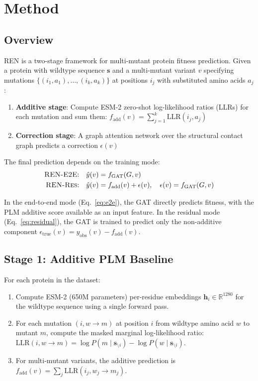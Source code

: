 \documentclass{article}
\newcommand{\ren}{\textsc{REN}}
\newcommand{\rene}{\textsc{REN-E2E}}
\newcommand{\renr}{\textsc{REN-Res}}
\begin{document}
\section{Method}
\label{sec:method}

\subsection{Overview}

\ren{} is a two-stage framework for multi-mutant protein fitness prediction. Given a protein with wildtype sequence $\mathbf{s}$ and a multi-mutant variant $v$ specifying mutations $\{(i_1, a_1), \ldots, (i_k, a_k)\}$ at positions $i_j$ with substituted amino acids $a_j$:

\begin{enumerate}
    \item \textbf{Additive stage}: Compute ESM-2 zero-shot log-likelihood ratios (LLRs) for each mutation and sum them: $f_\text{add}(v) = \sum_{j=1}^{k} \text{LLR}(i_j, a_j)$
    \item \textbf{Correction stage}: A graph attention network over the structural contact graph predicts a correction $\epsilon(v)$
\end{enumerate}

The final prediction depends on the training mode:
\begin{align}
    \text{\rene{}:} \quad \hat{y}(v) &= f_\text{GAT}(G, v) \label{eq:e2e} \\
    \text{\renr{}:} \quad \hat{y}(v) &= f_\text{add}(v) + \epsilon(v), \quad \epsilon(v) = f_\text{GAT}(G, v) \label{eq:residual}
\end{align}

In the end-to-end mode (Eq.~\ref{eq:e2e}), the GAT directly predicts fitness, with the PLM additive score available as an input feature. In the residual mode (Eq.~\ref{eq:residual}), the GAT is trained to predict only the non-additive component $\epsilon_\text{true}(v) = y_\text{obs}(v) - f_\text{add}(v)$.

\subsection{Stage 1: Additive PLM Baseline}

For each protein in the dataset:
\begin{enumerate}
    \item Compute ESM-2 (650M parameters) per-residue embeddings $\mathbf{h}_i \in \mathbb{R}^{1280}$ for the wildtype sequence using a single forward pass.
    \item For each mutation $(i, w \to m)$ at position $i$ from wildtype amino acid $w$ to mutant $m$, compute the masked marginal log-likelihood ratio: $\text{LLR}(i, w \to m) = \log P(m \mid \mathbf{s}_{\setminus i}) - \log P(w \mid \mathbf{s}_{\setminus i})$.
    \item For multi-mutant variants, the additive prediction is $f_\text{add}(v) = \sum_{j} \text{LLR}(i_j, w_j \to m_j)$.
\end{enumerate}
\end{document}
